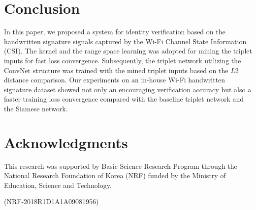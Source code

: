 \documentclass{sig-alternate-05-2015}
\begin{document}
\section{Conclusion}
In this paper, we proposed a system for identity verification based on the handwritten signature signals captured by the Wi-Fi Channel State Information (CSI). 
The kernel and the range space learning was adopted for mining the triplet inputs for fast loss convergence. 
Subsequently, the triplet network utilizing the ConvNet structure was trained with the mined triplet inputs based on the $L2$ distance comparison. 
Our experiments on an in-house Wi-Fi handwritten signature dataset showed not only an encouraging verification accuracy but also a faster training loss convergence compared with the baseline triplet network and the Siamese network.

\section{Acknowledgments}
This research was supported by Basic Science Research
Program through the National Research Foundation of Korea
(NRF) funded by the Ministry of Education, Science and
Technology.

\noindent(NRF-2018R1D1A1A09081956)

%

%
%
\end{document}
